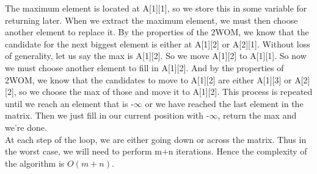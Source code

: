 \documentclass{article}[12pt]
\begin{document}
The maximum element is located at A[1][1], so we store this in some variable for returning later. When we extract the maximum element, we must then choose another element to replace it. By the properties of the 2WOM, we know that the candidate for the next biggest element is either at A[1][2] or A[2][1]. Without loss of generality, let us say the max is A[1][2]. So we move A[1][2] to A[1][1]. So now we must choose another element to fill in A[1][2]. And by the properties of 2WOM, we know that the candidates to move to A[1][2] are either A[1][3] or A[2][2], so we choose the max of those and move it to A[1][2]. This process is repeated until we reach an element that is -$\infty$ or we have reached the last element in the matrix. Then we just fill in our current position with -$\infty$, return the max and we're done.\\
At each step of the loop, we are either going down or across the matrix. Thus in the worst case, we will need to perform m+n iterations. Hence the complexity of the algorithm is $O(m+n)$.
\end{document}
